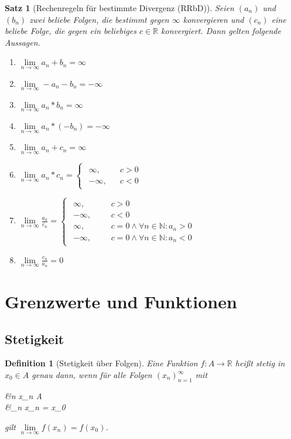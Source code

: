 \documentclass{article}
\newtheorem{thm}{Satz}[section]
\newtheorem{defn}{Definition}[section]
\newenvironment{aleq*}{\begin{equation*}\begin{aligned}}{\end{aligned}\end{equation*}}
\begin{document}
	\begin{thm}[Rechenregeln für bestimmte Divergenz (RRbD)]
		Seien \((a_n)\) und \((b_n)\) zwei beliebe Folgen, die bestimmt gegen \(\infty\) konvergieren und \((c_n)\) eine beliebe Folge, die gegen ein beliebiges \(c \in \mathbb{R}\) konvergiert. Dann gelten folgende Aussagen.
		\begin{enumerate}
			\item \(\lim\limits_{n \to \infty} a_n + b_n = \infty\)
			\item \(\lim\limits_{n \to \infty} -a_n - b_n = -\infty\)
			\item \(\lim\limits_{n \to \infty} a_n * b_n = \infty\)
			\item \(\lim\limits_{n \to \infty} a_n * (- b_n) = -\infty\)
			\item \(\lim\limits_{n \to \infty} a_n + c_n = \infty\)
			\item \(\lim\limits_{n \to \infty} a_n * c_n = 
			\begin{cases}
				\begin{aligned}
					\infty, &&c > 0 \\
					-\infty, &&c < 0
				\end{aligned}
			\end{cases}\)
			\item \(\lim\limits_{n \to \infty} \frac{a_n}{c_n} = 
			\begin{cases}
				\begin{aligned}
					\infty, &&&c > 0 \\
					-\infty, &&&c< 0 \\
					\infty, &&&c = 0 \land \forall n \in \mathbb{N} \colon a_n > 0 \\
					-\infty, &&&c = 0 \land \forall n \in \mathbb{N} \colon a_n < 0
				\end{aligned}
			\end{cases}\)
			\item \(\lim\limits_{n \to \infty} \frac{c_n}{a_n} = 0\)
		\end{enumerate}
	\end{thm}
	
	\section{Grenzwerte und Funktionen}
	\subsection{Stetigkeit}
	\begin{defn}[Stetigkeit über Folgen]
		Eine Funktion \(f \colon A \to \mathbb{R}\) heißt stetig in \(x_0 \in A\) genau dann, wenn für alle Folgen \((x_n)_{n=1}^\infty\) mit 
		\begin{aleq*}
			&\forall n \colon x_n \in A \\
			\land &\lim_{n \to \infty} x_n = x_0
		\end{aleq*}
		
		gilt \(\lim\limits_{n \to \infty}  f(x_n) = f(x_0)\).
	\end{defn}
	
\end{document}
